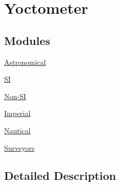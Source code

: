 \hypertarget{group___e_g_x_math-_conversions-_length_conversions-_yoctometer}{}\section{Yoctometer}
\label{group___e_g_x_math-_conversions-_length_conversions-_yoctometer}
\subsection*{Modules}
\begin{DoxyCompactItemize}
\item 
\mbox{\hyperlink{group___e_g_x_math-_conversions-_length_conversions-_yoctometer-_astronomical}{Astronomical}}
\item 
\mbox{\hyperlink{group___e_g_x_math-_conversions-_length_conversions-_yoctometer-_s_i}{SI}}
\item 
\mbox{\hyperlink{group___e_g_x_math-_conversions-_length_conversions-_yoctometer-_non-_s_i}{Non-\/\+SI}}
\item 
\mbox{\hyperlink{group___e_g_x_math-_conversions-_length_conversions-_yoctometer-_imperial}{Imperial}}
\item 
\mbox{\hyperlink{group___e_g_x_math-_conversions-_length_conversions-_yoctometer-_nautical}{Nautical}}
\item 
\mbox{\hyperlink{group___e_g_x_math-_conversions-_length_conversions-_yoctometer-_surveyors}{Surveyors}}
\end{DoxyCompactItemize}


\subsection{Detailed Description}
